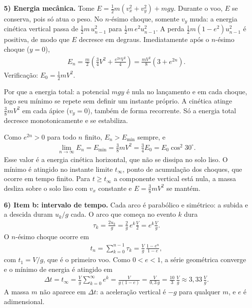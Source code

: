 \documentclass{article}%
\begin{document}
\textbf{5) Energia mecânica.} Tome $E = \frac{1}{2}m\left(v_x^2+v_y^2\right)+mgy$. Durante o voo, $E$ se conserva, pois só atua o peso. No $n$-ésimo choque, somente $v_y$ muda: a energia cinética vertical passa de $\frac{1}{2}m\,u_{n-1}^2$ para $\frac{1}{2}m\,e^2u_{n-1}^2$. A perda $\frac{1}{2}m(1-e^2)u_{n-1}^2$ é positiva, de modo que $E$ decresce em degraus. Imediatamente após o $n$-ésimo choque ($y=0$),
\begin{align*}
E_n = \frac{m}{2}\left(\frac{3}{4}V^2 + \frac{e^{2n}V^2}{4}\right) = \frac{mV^2}{8}\left(3+e^{2n}\right).
\end{align*}
Verificação: $E_0 = \frac{1}{2}mV^2$.

Por que a energia total: a potencial $mgy$ é nula no lançamento e em cada choque, logo seu mínimo se repete sem definir um instante próprio. A cinética atinge $\frac{3}{8}mV^2$ em cada ápice ($v_y=0$), também de forma recorrente. Só a energia total decresce monotonicamente e se estabiliza.

Como $e^{2n}>0$ para todo $n$ finito, $E_n > E_{\min}$ sempre, e
\begin{align*}
\lim_{n\to\infty}E_n = E_{\min} = \frac{3}{8}mV^2 = \frac{3}{4}E_0 = E_0\cos^2 30^\circ.
\end{align*}
Esse valor é a energia cinética horizontal, que não se dissipa no solo liso. O mínimo é atingido no instante limite $t_\infty$, ponto de acumulação dos choques, que ocorre em tempo finito. Para $t\ge t_\infty$ a componente vertical está nula, a massa desliza sobre o solo liso com $v_x$ constante e $E = \frac{3}{8}mV^2$ se mantém.

\textbf{6) Item b: intervalo de tempo.} Cada arco é parabólico e simétrico: a subida e a descida duram $u_k/g$ cada. O arco que começa no evento $k$ dura
\begin{align*}
\tau_k = \frac{2u_k}{g} = \frac{2}{g}\,e^{k}\frac{V}{2} = e^{k}\frac{V}{g}.
\end{align*}
O $n$-ésimo choque ocorre em
\begin{align*}
t_n = \sum_{k=0}^{n-1}\tau_k = \frac{V}{g}\,\frac{1-e^{n}}{1-e},
\end{align*}
com $t_1 = V/g$, que é o primeiro voo. Como $0<e<1$, a série geométrica converge e o mínimo de energia é atingido em
\begin{align*}
\Delta t = t_\infty = \frac{V}{g}\sum_{k=0}^{\infty}e^{k} = \frac{V}{g(1-e)} = \frac{V}{0{,}3\,g} = \frac{10}{3}\,\frac{V}{g}\approx 3{,}33\,\frac{V}{g}.
\end{align*}
A massa $m$ não aparece em $\Delta t$: a aceleração vertical é $-g$ para qualquer $m$, e $e$ é adimensional.
\end{document}
